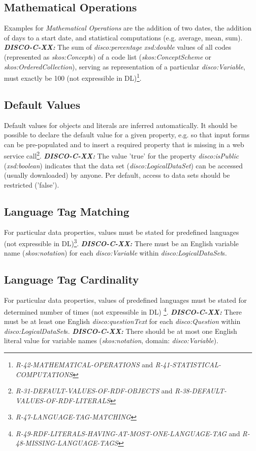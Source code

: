 \documentclass{elsart3p}    %
\begin{document}
\subsection{Mathematical Operations}

Examples for {\em Mathematical Operations} are the addition of two dates, the addition of days to a start date, and statistical computations (e.g. average, mean, sum).
\textbf{{\em DISCO-C-XX:}}
The sum of {\em disco:percentage} {\em xsd:double} values of all codes (represented as {\em skos:Concept}s) of a code list ({\em skos:ConceptScheme} or {\em skos:OrderedCollection}), serving as representation of a particular {\em disco:Variable}, must exactly be 100  
(not expressible in DL)\footnote{{\em R-42-MATHEMATICAL-OPERATIONS} and {\em R-41-STATISTICAL-COMPUTATIONS}}.

\subsection{Default Values}

Default values for objects and literals are inferred automatically.
It should be possible to declare the default value for a given property, e.g. so that input forms can be pre-populated and to insert a required property that is missing in a web service call\footnote{{\em R-31-DEFAULT-VALUES-OF-RDF-OBJECTS} and {\em R-38-DEFAULT-VALUES-OF-RDF-LITERALS}}.
\textbf{{\em DISCO-C-XX:}}
The value 'true' for the property {\em disco:isPublic} ({\em xsd:boolean}) indicates that the data set ({\em disco:LogicalDataSet}) can be accessed (usually downloaded) by anyone.
Per default, access to data sets should be restricted ('false').

\subsection{Language Tag Matching}

For particular data properties, values must be stated for predefined languages (not expressible in DL)\footnote{{\em R-47-LANGUAGE-TAG-MATCHING}}.
\textbf{{\em DISCO-C-XX:}}
There must be an English variable name ({\em skos:notation}) for each {\em disco:Variable} within {\em disco:LogicalDataSet}s.

\subsection{Language Tag Cardinality}

For particular data properties, values of predefined languages must be stated for determined number of times (not expressible in DL)
\footnote{{\em R-49-RDF-LITERALS-HAVING-AT-MOST-ONE-LANGUAGE-TAG} and {\em R-48-MISSING-LANGUAGE-TAGS}}.
\textbf{{\em DISCO-C-XX:}}
There must be at least one English {\em disco:questionText} for each {\em disco:Question} within {\em disco:LogicalDataSet}s.
\textbf{{\em DISCO-C-XX:}}
There should be at most one English literal value for variable names ({\em skos:notation}, domain: {\em disco:Variable}).
\end{document}
